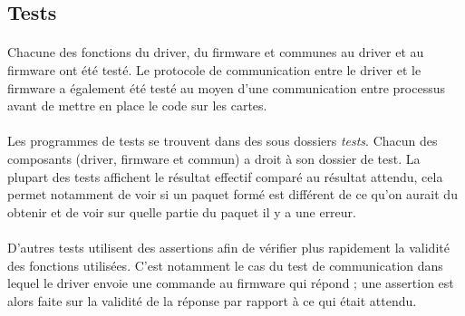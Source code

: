 \subsection{Tests}
\paragraph{}
Chacune des fonctions du driver, du firmware et communes au driver et au
firmware ont été testé. Le protocole de communication entre le driver et le
firmware a également été testé au moyen d'une communication entre processus
avant de mettre en place le code sur les cartes.
\paragraph{}
Les programmes de tests se trouvent dans des sous dossiers \emph{tests}.
Chacun des composants (driver, firmware et commun) a droit à son dossier de
test. La plupart des tests affichent le résultat effectif comparé au résultat
attendu, cela permet notamment de voir si un paquet formé est différent de ce
qu'on aurait du obtenir et de voir sur quelle partie du paquet il y a une
erreur.
\paragraph{}
D'autres tests utilisent des assertions afin de vérifier plus rapidement la
validité des fonctions utilisées. C'est notamment le cas du test de
communication dans lequel le driver envoie une commande au firmware qui
répond ; une assertion est alors faite sur la validité de la réponse par
rapport à ce qui était attendu.
